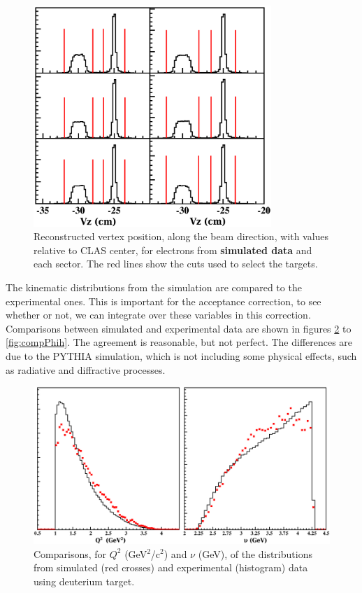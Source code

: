 \begin{figure}[tpb]
\centering
\includegraphics[width=9cm] {chap5-fig/Vertex_el_sim.png}
\caption {Reconstructed vertex position, along the beam direction, with values 
relative to CLAS center, for electrons from {\bf simulated data} and each 
sector. The red lines show the cuts used to select the targets.}
\label{simvertex}
\end{figure}

The kinematic distributions from the simulation are compared to the 
experimental ones. This is important for the acceptance correction, to see 
whether or not, we can integrate over these variables in this correction.
Comparisons between simulated and experimental data are shown in figures 
\ref{fig:compNuQ2} to \ref{fig:compPhih}. The agreement is reasonable, but not 
perfect. The differences are due to the PYTHIA simulation, which is not including some 
physical effects, such as radiative and diffractive processes.

\begin{figure}[tbp]
\centering
\includegraphics[width=12cm] {chap5-fig/El_compar.png}
\caption {Comparisons, for $Q^2$ (GeV$^2$/c$^2$) and $\nu$ (GeV), of the distributions
from simulated (red crosses) and experimental (histogram) data using deuterium target.}
\label{fig:compNuQ2}
\end{figure}

